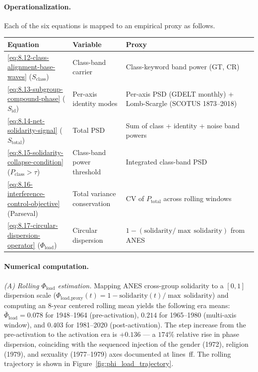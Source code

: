 \paragraph{Operationalization.}
Each of the six equations is mapped to an empirical proxy as follows.

\medskip
\noindent
\begin{tabularx}{\linewidth}{@{}llX@{}}
\toprule
\textbf{Equation} & \textbf{Variable} & \textbf{Proxy} \\
\midrule
\ref{eq:8.12-class-alignment-base-waves} ($S_{\text{class}}$) & Class-band carrier & Class-keyword band power (GT, CR) \\
\ref{eq:8.13-subgroup-compound-phase} ($S_{\text{id}}$) & Per-axis identity modes & Per-axis PSD (GDELT monthly) + Lomb-Scargle (SCOTUS 1873--2018) \\
\ref{eq:8.14-net-solidarity-signal} ($S_{\text{total}}$) & Total PSD & Sum of class + identity + noise band powers \\
\ref{eq:8.15-solidarity-collapse-condition} ($P_{\text{class}} > \tau$) & Class-band power threshold & Integrated class-band PSD \\
\ref{eq:8.16-interference-control-objective} (Parseval) & Total variance conservation & CV of $P_{\text{total}}$ across rolling windows \\
\ref{eq:8.17-circular-dispersion-operator} ($\Phi_{\text{load}}$) & Circular dispersion & $1 - (\text{solidarity} / \max\,\text{solidarity})$ from ANES \\
\bottomrule
\end{tabularx}

\paragraph{Numerical computation.}
\textit{(A) Rolling $\Phi_{\text{load}}$ estimation.} Mapping ANES cross-group
solidarity to a $[0,1]$ dispersion scale ($\Phi_{\text{load,proxy}}(t) = 1 -
\text{solidarity}(t)/\max\,\text{solidarity}$) and computing an 8-year centered
rolling mean yields the following era means: $\bar{\Phi}_{\text{load}} = 0.078$ for
1948--1964 (pre-activation), $0.214$ for 1965--1980 (multi-axis window), and $0.403$
for 1981--2020 (post-activation). The step increase from the pre-activation to the
activation era is $+0.136$ --- a $174\%$ relative rise in phase dispersion, coinciding
with the sequenced injection of the gender (1972), religion (1979), and sexuality
(1977--1979) axes documented at lines~\pageref{fig:suppression_substitution}ff. The
rolling trajectory is shown in Figure~\ref{fig:phi_load_trajectory}.

